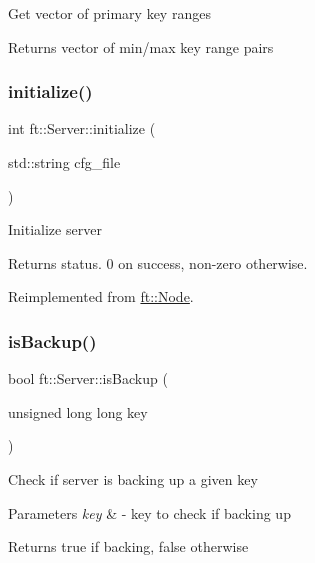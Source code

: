 Get vector of primary key ranges

\begin{DoxyReturn}{Returns}
vector of min/max key range pairs 
\end{DoxyReturn}
\mbox{\label{classft_1_1Server_a834002a833999b593d357b72ef69ddcf}} 
\subsubsection{\texorpdfstring{initialize()}{initialize()}}
{\footnotesize\ttfamily int ft\+::\+Server\+::initialize (\begin{DoxyParamCaption}\item[{std\+::string}]{cfg\+\_\+file }\end{DoxyParamCaption})\hspace{0.3cm}{\ttfamily [virtual]}}

Initialize server

\begin{DoxyReturn}{Returns}
status. 0 on success, non-\/zero otherwise. 
\end{DoxyReturn}


Reimplemented from \mbox{\hyperlink{classft_1_1Node_addc92fd2c5cae12a8ea68c30b7202e91}{ft\+::\+Node}}.

\mbox{\label{classft_1_1Server_aae86da697b404a1337b94b2a1ee7d5ed}} 
\subsubsection{\texorpdfstring{is\+Backup()}{isBackup()}}
{\footnotesize\ttfamily bool ft\+::\+Server\+::is\+Backup (\begin{DoxyParamCaption}\item[{unsigned long long}]{key }\end{DoxyParamCaption})}

Check if server is backing up a given key


\begin{DoxyParams}{Parameters}
{\em key} & -\/ key to check if backing up\\
\hline
\end{DoxyParams}
\begin{DoxyReturn}{Returns}
true if backing, false otherwise 
\end{DoxyReturn}
\mbox{\label{classft_1_1Server_ac3c476b8dad7bbb3fb39470c79dc2a6e}} 
